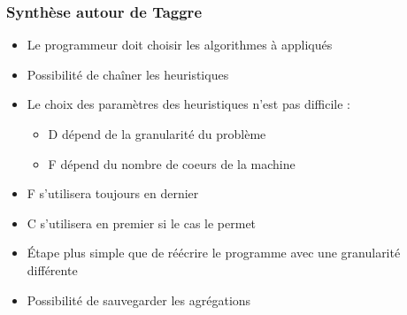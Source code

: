 \documentclass{beamer}
\begin{document}
\begin{frame}
  \frametitle{Synthèse autour de Taggre}

  \begin{itemize}
    \item Le programmeur doit choisir les algorithmes à appliqués
    \item Possibilité de chaîner les heuristiques
    \item Le choix des paramètres des heuristiques n'est pas difficile :
      \begin{itemize}
        \item D dépend de la granularité du problème
        \item F dépend du nombre de coeurs de la machine
      \end{itemize}
    \item F s'utilisera toujours en dernier
    \item C s'utilisera en premier si le cas le permet
    \item \'Etape plus simple que de réécrire le programme avec une granularité différente
    \item Possibilité de sauvegarder les agrégations
  \end{itemize}

\end{frame}


\end{document}
